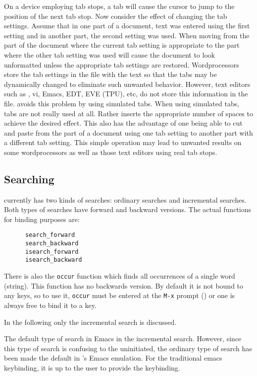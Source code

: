   On a device employing tab stops, a tab will cause the cursor to jump to
  the position of the next tab stop.  Now consider the effect of changing
  the tab settings.  Assume that in one part of a document, text was entered
  using the first setting and in another part, the second setting was used.
  When moving from the part of the document where the current tab setting is
  appropriate to the part where the other tab setting was used will cause
  the document to look unformatted unless the appropriate tab settings are
  restored. Wordprocessors store the tab settings in the file with the text
  so that the tabs may be dynamically changed to eliminate such unwanted
  behavior. However, text editors such as \jed{}, vi, Emacs, EDT, EVE (TPU),
  etc, do not store this information in the file. \jed{} avoids this problem
  by using simulated tabs.  When using simulated tabs, tabs are not really
  used at all. Rather \jed{} inserts the appropriate number of spaces to
  achieve the desired effect.  This also has the advantage of one being able
  to cut and paste from the part of a document using one tab setting to
  another part with a different tab setting.  This simple operation may lead
  to unwanted results on some wordprocessors as well as those text editors
  using real tab stops.

\subsection{Searching}

  \jed{} currently has two kinds of searches: ordinary searches and
  incremental searches.  Both types of searches have forward and backward
  versions.  The actual functions for binding purposes are:

\begin{verbatim}
      search_forward
      search_backward
      isearch_forward
      isearch_backward
\end{verbatim}

  There is also the \verb|occur| function which finds all occurrences of a
  single word (string).  This function has no backwards version. By default
  it is not bound to any keys, so to use it, \verb|occur| must be entered at
  the \verb|M-x| prompt () or one is always free to bind it
  to a key.

  In the following only the incremental search is discussed.

  The default type of search in Emacs in the incremental search. However,
  since this type of search is confusing to the uninitiated, the ordinary
  type of search has been made the default in \jed{}'s Emacs emulation. For the
  traditional emacs keybinding, it is up to the user to provide the
  keybinding.

